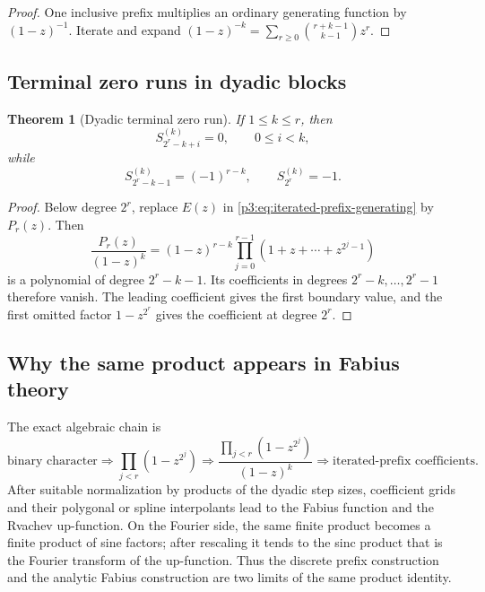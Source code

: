 \documentclass[11pt,oneside]{article}
\newtheorem{theorem}{Theorem}[section]
\theoremstyle{definition}
\theoremstyle{remark}
\begin{document}
\begin{proof}
One inclusive prefix multiplies an ordinary generating function by
$(1-z)^{-1}$.  Iterate and expand
$(1-z)^{-k}=\sum_{r\ge0}\binom{r+k-1}{k-1}z^r$.
\end{proof}

\subsection{Terminal zero runs in dyadic blocks}

\begin{theorem}[Dyadic terminal zero run]\label{p3:thm:terminal-zero-run}
If $1\le k\le r$, then
\begin{equation}\label{p3:eq:terminal-zero-run}
 S_{2^r-k+i}^{(k)}=0,
 \qquad 0\le i<k,
\end{equation}
while
\begin{equation}\label{p3:eq:terminal-boundaries}
 S_{2^r-k-1}^{(k)}=(-1)^{r-k},
 \qquad
 S_{2^r}^{(k)}=-1.
\end{equation}
\end{theorem}

\begin{proof}
Below degree $2^r$, replace $E(z)$ in
\cref{p3:eq:iterated-prefix-generating} by $P_r(z)$.  Then
\begin{equation}\label{p3:eq:prefix-polynomial-degree}
 \frac{P_r(z)}{(1-z)^k}
 =(1-z)^{r-k}
 \prod_{j=0}^{r-1}(1+z+\cdots+z^{2^j-1})
\end{equation}
is a polynomial of degree $2^r-k-1$.  Its coefficients in degrees
$2^r-k,\ldots,2^r-1$ therefore vanish.  The leading coefficient gives the
first boundary value, and the first omitted factor $1-z^{2^r}$ gives the
coefficient at degree $2^r$.
\end{proof}

\subsection{Why the same product appears in Fabius theory}

The exact algebraic chain is
\begin{equation}\label{p3:eq:fabius-chain}
 \text{binary character}
 \Longrightarrow
 \prod_{j<r}(1-z^{2^j})
 \Longrightarrow
 \frac{\prod_{j<r}(1-z^{2^j})}{(1-z)^k}
 \Longrightarrow
 \text{iterated-prefix coefficients}.
\end{equation}
After suitable normalization by products of the dyadic step sizes, coefficient
grids and their polygonal or spline interpolants lead to the Fabius function
and the Rvachev up-function.  On the Fourier side, the same finite product
becomes a finite product of sine factors; after rescaling it tends to the sinc
product that is the Fourier transform of the up-function.  Thus the discrete
prefix construction and the analytic Fabius construction are two limits of the
same product identity.
\end{document}
